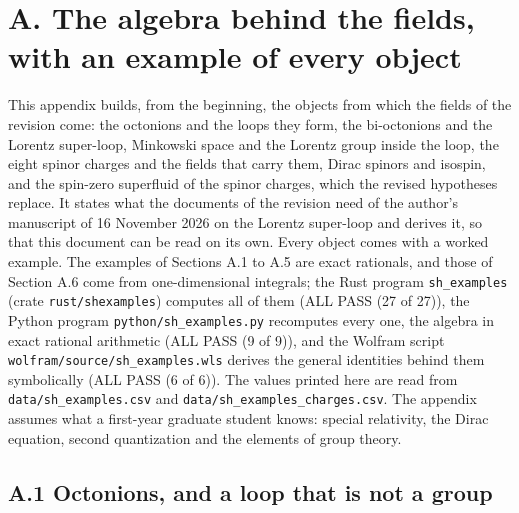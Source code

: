 \documentclass[
  10pt,
]{article}
\begin{document}
\hypertarget{a.-the-algebra-behind-the-fields-with-an-example-of-every-object}{%
\section{A. The algebra behind the fields, with an example of every
object}\label{a.-the-algebra-behind-the-fields-with-an-example-of-every-object}}

This appendix builds, from the beginning, the objects from which the
fields of the revision come: the octonions and the loops they form, the
bi-octonions and the Lorentz super-loop, Minkowski space and the Lorentz
group inside the loop, the eight spinor charges and the fields that
carry them, Dirac spinors and isospin, and the spin-zero superfluid of
the spinor charges, which the revised hypotheses replace. It states what
the documents of the revision need of the author's manuscript of 16
November 2026 on the Lorentz super-loop and derives it, so that this
document can be read on its own. Every object comes with a worked
example. The examples of Sections A.1 to A.5 are exact rationals, and
those of Section A.6 come from one-dimensional integrals; the Rust
program \texttt{sh\_examples} (crate \texttt{rust/shexamples}) computes
all of them (ALL PASS (27 of 27)), the Python program
\texttt{python/sh\_examples.py} recomputes every one, the algebra in
exact rational arithmetic (ALL PASS (9 of 9)), and the Wolfram script
\texttt{wolfram/source/sh\_examples.wls} derives the general identities
behind them symbolically (ALL PASS (6 of 6)). The values printed here
are read from \texttt{data/sh\_examples.csv} and
\texttt{data/sh\_examples\_charges.csv}. The appendix assumes what a
first-year graduate student knows: special relativity, the Dirac
equation, second quantization and the elements of group theory.

\hypertarget{a.1-octonions-and-a-loop-that-is-not-a-group}{%
\subsection{A.1 Octonions, and a loop that is not a
group}\label{a.1-octonions-and-a-loop-that-is-not-a-group}}
\end{document}
